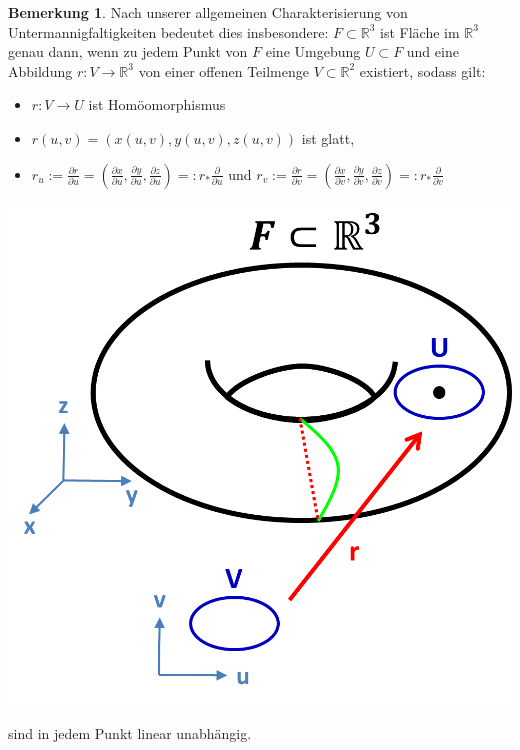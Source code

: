 \documentclass[a4paper,11pt,notitlepage]{report}
\theoremstyle{definition}
\newtheorem{remark}{Bemerkung}[chapter]
\newcommand{\R}{{\ensuremath{\mathbb{R}}}}
\begin{document}
\begin{remark}
	Nach unserer allgemeinen Charakterisierung von Untermannigfaltigkeiten bedeutet dies insbesondere: \newline
	$F \subset \R^3$ ist Fläche im $\R^3$ genau dann, wenn zu jedem Punkt von $F$ eine Umgebung $U \subset F$ und eine Abbildung $r \colon V \rightarrow \R^3$ von einer offenen Teilmenge $V \subset \R^2$ existiert, sodass gilt: 
	\begin{itemize}
		\item $r \colon V \rightarrow U$ ist Homöomorphismus
		\item $r(u,v) = (x(u,v), y(u,v), z(u,v))$ ist glatt,
		\item $r_u := \frac{\partial r}{\partial u} = (\frac{\partial x}{\partial u}, \frac{\partial y}{\partial u}, \frac{\partial z}{\partial u}) =: r_* \frac{\partial}{\partial u}$ und $r_v := \frac{\partial r}{\partial v} = (\frac{\partial x}{\partial v}, \frac{\partial y}{\partial v}, \frac{\partial z}{\partial v}) =: r_* \frac{\partial}{\partial v}$
	\end{itemize}
	\begin{center}
		\includegraphics[scale=0.5]{images/2012_01_17_Bild.png}
	\end{center}
	sind in jedem Punkt linear unabhängig.
\end{remark}
\end{document}
